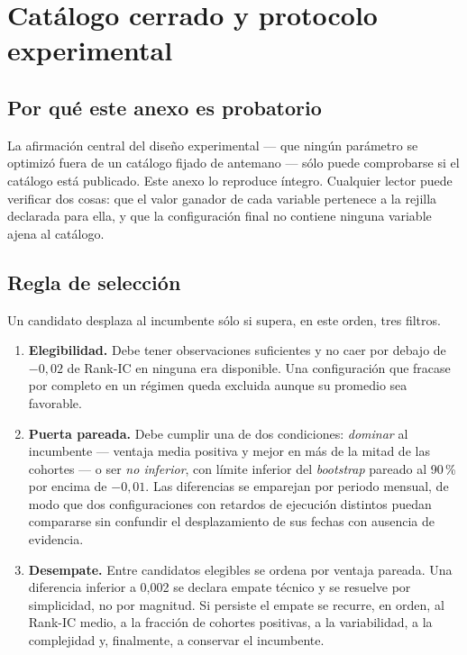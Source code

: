 \chapter{Catálogo cerrado y protocolo experimental}
\label{anexo:catalogo}

\section{Por qué este anexo es probatorio}

La afirmación central del diseño experimental --- que ningún parámetro se optimizó fuera de un
catálogo fijado de antemano --- sólo puede comprobarse si el catálogo está publicado. Este anexo lo
reproduce íntegro. Cualquier lector puede verificar dos cosas: que el valor ganador de cada variable
pertenece a la rejilla declarada para ella, y que la configuración final no contiene ninguna
variable ajena al catálogo.

\section{Regla de selección}

Un candidato desplaza al incumbente sólo si supera, en este orden, tres filtros.

\begin{enumerate}[leftmargin=*,itemsep=0.35em]
  \item \textbf{Elegibilidad.} Debe tener observaciones suficientes y no caer por debajo de $-0{,}02$
  de Rank-IC en ninguna era disponible. Una configuración que fracase por completo en un régimen
  queda excluida aunque su promedio sea favorable.
  \item \textbf{Puerta pareada.} Debe cumplir una de dos condiciones: \emph{dominar} al incumbente
  --- ventaja media positiva y mejor en más de la mitad de las cohortes --- o ser \emph{no inferior},
  con límite inferior del \textit{bootstrap} pareado al 90\,\% por encima de $-0{,}01$. Las
  diferencias se emparejan por periodo mensual, de modo que dos configuraciones con retardos de
  ejecución distintos puedan compararse sin confundir el desplazamiento de sus fechas con ausencia
  de evidencia.
  \item \textbf{Desempate.} Entre candidatos elegibles se ordena por ventaja pareada. Una diferencia
  inferior a 0,002 se declara empate técnico y se resuelve por simplicidad, no por magnitud. Si
  persiste el empate se recurre, en orden, al Rank-IC medio, a la fracción de cohortes positivas, a
  la variabilidad, a la complejidad y, finalmente, a conservar el incumbente.
\end{enumerate}

